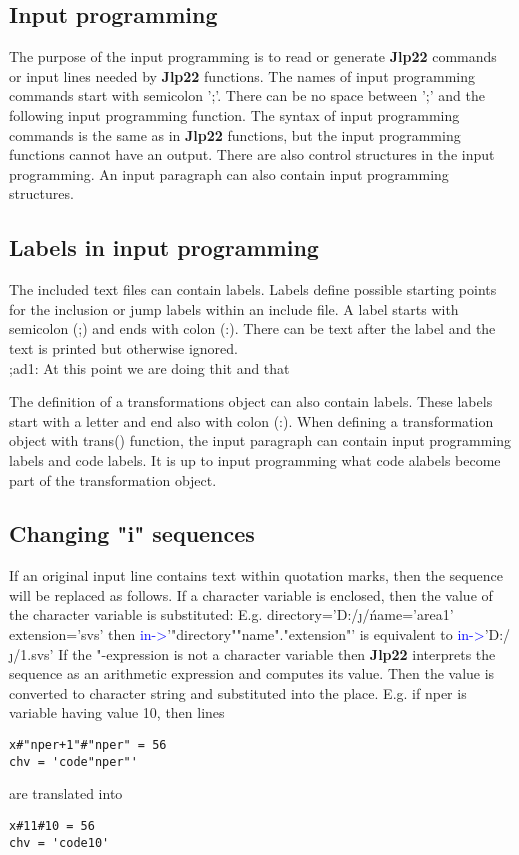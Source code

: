 \subsection{Input programming} 
\label{inpuprog} 
The purpose of the input programming is to read or generate \textbf{Jlp22} commands or input lines 
needed by \textbf{Jlp22} functions. The names of input programming commands start with semicolon ';'. 
There can be no space between ';' and the following input programming function. The syntax 
of input programming commands is the same as in \textbf{Jlp22} functions, but the input programming 
functions cannot have an output. There are also control structures in the input programming. 
An input paragraph can also contain input programming structures. 
\subsection{ Labels in input programming} 
\label{inpuad} 
 
The included text files can contain labels. Labels define possible starting points for the 
inclusion or jump labels within an include file. A label starts with semicolon (;) and 
ends with colon (:). There can be text after the label and the text is printed but 
otherwise ignored.\\ 
 
 
;ad1:  At this point we are doing thit and that 
 
 
\begin{note} 
The definition of a transformations object can also contain labels. These labels start 
with a letter and end also with colon (:). When defining a transformation object with \textcolor{VioletRed}{trans}() function, 
the input paragraph can contain input programming labels and code labels. It is up to 
input programming what code alabels become part of the transformation object. 
\end{note} 
 
 
\subsection{Changing "i" sequences} 
\label{inpureplace} 
If an original input line contains text within quotation marks, then the sequence will be replaced 
as follows. If a character variable is enclosed, then the value of the character variable is 
substituted: E.g. 
directory='D:/\j/\' 
name='area1' 
extension='svs' 
then 
\textcolor{blue}{in->}'"directory""name"."extension"' 
is equivalent to 
\textcolor{blue}{in->}'D:/\j/\area1.svs' 
If the "-expression is not a character variable then \textbf{Jlp22} interprets the sequence as an arithmetic 
expression and computes its value. Then the value is converted to character string and 
substituted into the place. E.g. if nper is variable having value 10, then lines 
\color{Green} 
\begin{verbatim} 
x#"nper+1"#"nper" = 56 
chv = 'code"nper"' 
\end{verbatim} 
\color{Black} 
are translated into 
\color{Green} 
\begin{verbatim} 
x#11#10 = 56 
chv = 'code10' 
\end{verbatim} 
\color{Black} 
 
